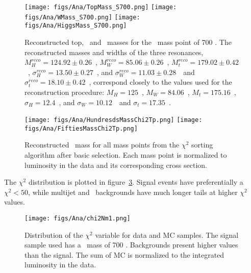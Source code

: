 \begin{figure}[!Hhtbp]
  \begin{center}
    \texttt{[image: figs/Ana/TopMass\_S700.png]}
    \texttt{[image: figs/Ana/WMass\_S700.png]}
    \texttt{[image: figs/Ana/HiggsMass\_S700.png]}
    \caption{Reconstructed top, \W~and \Hb~masses for the \Tp~mass point of 700 \GeVcc. The reconstructed masses and widths of the three resonances, $M^{reco}_{H}=124.92\pm0.26$~\GeVcc, $M^{reco}_{W}=85.06\pm0.26$~\GeVcc, $M^{reco}_{t}=179.02\pm0.42$~\GeVcc, $\sigma^{reco}_{H}=13.50\pm0.27$~\GeVcc, and $\sigma^{reco}_{W}=11.03\pm0.28$~\GeVcc~and $\sigma^{reco}_{t}=18.10\pm0.42$~\GeVcc, correspond closely to the values used for the reconstruction procedure: $M_{H}=125$~\GeVcc, $M_{W}=84.06$~\GeVcc, $M_{t}=175.16$~\GeVcc, $\sigma_{H}=12.4$~\GeVcc, and $\sigma_{W}=10.12$~\GeVcc~and $\sigma_{t}=17.35$~\GeVcc.}
    \label{fig:WHt}
  \end{center}
\end{figure}

\begin{figure}[!Hhtbp]
  \begin{center}
    \texttt{[image: figs/Ana/HundresdsMassChi2Tp.png]}
    \texttt{[image: figs/Ana/FiftiesMassChi2Tp.png]}
    \caption{Reconstructed \Tp~mass for all mass points from the $\chi^{2}$ sorting algorithm after basic selection. Each mass point is normalized to luminosity in the data and its corresponding cross section. }
    \label{fig:RecT}
  \end{center}
\end{figure}

The $\chi^{2}$ distribution is plotted in figure~\ref{fig:chi2}. Signal events have preferentially a $\chi^{2}<50$, while multijet and \ttbar~backgrounds have much longer tails at higher $\chi^{2}$ values.

\begin{figure}[!Hhtbp]
  \begin{center}
    \texttt{[image: figs/Ana/chi2Nm1.png]}
    \caption{Distribution of the $\chi^{2}$ variable for data and MC samples. The signal sample used has a \Tp~mass of 700 \GeVcc. Backgrounds present higher values than the signal. The sum of MC is normalized to the integrated luminosity in the data.}
    \label{fig:chi2}
  \end{center}
\end{figure}

